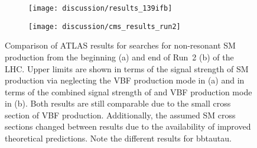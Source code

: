 \begin{figure}[tbp]
  \centering

  \begin{subfigure}[b]{0.65\textwidth}
    \hspace{1.05em}\texttt{[image: discussion/results\_139ifb]}

    \label{fig:atlas_run2_139ifb}
  \end{subfigure}

  \vspace{12pt}

  \begin{subfigure}[b]{0.65\textwidth}
    \texttt{[image: discussion/cms\_results\_run2]}

  \end{subfigure}

  \caption{Comparison of ATLAS results for searches for non-resonant SM \HH
    production from the beginning (a) and end of Run~2 (b) of the LHC. Upper
    limits are shown in terms of the signal strength of SM \HH production via
    \ggF neglecting the VBF production mode in (a) and in terms of the combined
    signal strength of \ggF and VBF production mode in (b). Both results are
    still comparable due to the small cross section of VBF \HH
    production. Additionally, the assumed SM \HH cross sections changed between
    results due to the availability of improved theoretical predictions.  Note
    the different results for bbtautau. }
  \label{fig:atlas_run2_hh_results}
\end{figure}




%   

